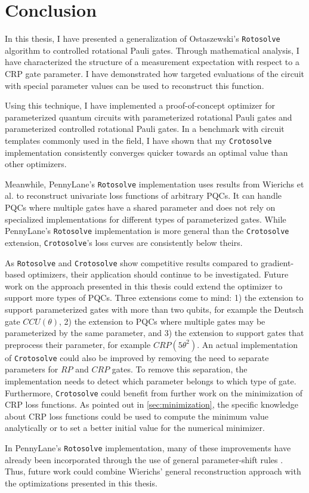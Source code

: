 \chapter{Conclusion}
\label{chap:conclusion}

In this thesis, I have presented a generalization of Ostaszewski's
\texttt{Rotosolve} algorithm to controlled rotational Pauli gates.
Through mathematical analysis, I have characterized the structure of a
measurement expectation with respect to a CRP gate parameter.
I have demonstrated how targeted evaluations of the circuit with special
parameter values can be used to reconstruct this function.

Using this technique, I have implemented a proof-of-concept optimizer for
parameterized quantum circuits with parameterized rotational Pauli gates and
parameterized controlled rotational Pauli gates.
In a benchmark with circuit templates \cite{sim_expressibility_2019} commonly
used in the field, I have shown that my \texttt{Crotosolve} implementation
consistently converges quicker towards an optimal value than other optimizers.

Meanwhile, PennyLane's \texttt{Rotosolve} implementation uses results from
Wierichs et al. \cite{wierichs_general_2022} to reconstruct univariate loss
functions of arbitrary PQCs.
It can handle PQCs where multiple gates have a shared parameter and does not
rely on specialized implementations for different types of parameterized gates.
While PennyLane's \texttt{Rotosolve} implementation is more general than the
\texttt{Crotosolve} extension, \texttt{Crotosolve}'s loss curves are
consistently below theirs.

As \texttt{Rotosolve} and \texttt{Crotosolve} show competitive results compared
to gradient-based optimizers, their application should continue to be
investigated.
Future work on the approach presented in this thesis could extend the optimizer
to support more types of PQCs.
Three extensions come to mind: 1) the extension to support parameterized gates
with more than two qubits, for example the Deutsch gate $CCU(\theta)$, 2) the
extension to PQCs where multiple gates may be parameterized by the same
parameter, and 3) the extension to support gates that preprocess their
parameter, for example $CRP(5\theta^2)$.
An actual implementation of \texttt{Crotosolve} could also be improved by
removing the need to separate parameters for $RP$ and $CRP$ gates.
To remove this separation, the implementation needs to detect which parameter
belongs to which type of gate.
Furthermore, \texttt{Crotosolve} could benefit from further work on the
minimization of CRP loss functions.
As pointed out in \autoref{sec:minimization}, the specific knowledge about CRP
loss functions could be used to compute the minimum value analytically or to set
a better initial value for the numerical minimizer.

In PennyLane's \texttt{Rotosolve} implementation, many of these improvements
have already been incorporated through the use of general parameter-shift rules
\cite{wierichs_general_2022}.
Thus, future work could combine Wierichs' general reconstruction approach with
the optimizations presented in this thesis.
%
